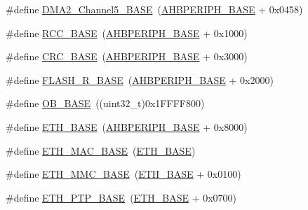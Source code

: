 \begin{DoxyCompactItemize}
\#define \mbox{\hyperlink{group___peripheral__memory__map_ga1eea983a5d68bf36f4d19fbb07955ca1}{D\+M\+A2\+\_\+\+Channel5\+\_\+\+B\+A\+SE}}~(\mbox{\hyperlink{group___peripheral__memory__map_ga92eb5d49730765d2abd0f5b09548f9f5}{A\+H\+B\+P\+E\+R\+I\+P\+H\+\_\+\+B\+A\+SE}} + 0x0458)
\item 
\#define \mbox{\hyperlink{group___peripheral__memory__map_ga0e681b03f364532055d88f63fec0d99d}{R\+C\+C\+\_\+\+B\+A\+SE}}~(\mbox{\hyperlink{group___peripheral__memory__map_ga92eb5d49730765d2abd0f5b09548f9f5}{A\+H\+B\+P\+E\+R\+I\+P\+H\+\_\+\+B\+A\+SE}} + 0x1000)
\item 
\#define \mbox{\hyperlink{group___peripheral__memory__map_ga656a447589e785594cbf2f45c835ad7e}{C\+R\+C\+\_\+\+B\+A\+SE}}~(\mbox{\hyperlink{group___peripheral__memory__map_ga92eb5d49730765d2abd0f5b09548f9f5}{A\+H\+B\+P\+E\+R\+I\+P\+H\+\_\+\+B\+A\+SE}} + 0x3000)
\item 
\#define \mbox{\hyperlink{group___peripheral__memory__map_ga8e21f4845015730c5731763169ec0e9b}{F\+L\+A\+S\+H\+\_\+\+R\+\_\+\+B\+A\+SE}}~(\mbox{\hyperlink{group___peripheral__memory__map_ga92eb5d49730765d2abd0f5b09548f9f5}{A\+H\+B\+P\+E\+R\+I\+P\+H\+\_\+\+B\+A\+SE}} + 0x2000)
\item 
\#define \mbox{\hyperlink{group___peripheral__memory__map_gab5b5fb155f9ee15dfb6d757da1adc926}{O\+B\+\_\+\+B\+A\+SE}}~((uint32\+\_\+t)0x1\+F\+F\+F\+F800)
\item 
\#define \mbox{\hyperlink{group___peripheral__memory__map_gad965a7b1106ece575ed3da10c45c65cc}{E\+T\+H\+\_\+\+B\+A\+SE}}~(\mbox{\hyperlink{group___peripheral__memory__map_ga92eb5d49730765d2abd0f5b09548f9f5}{A\+H\+B\+P\+E\+R\+I\+P\+H\+\_\+\+B\+A\+SE}} + 0x8000)
\item 
\#define \mbox{\hyperlink{group___peripheral__memory__map_ga3cf7005808feb61bff1fee01e50a711a}{E\+T\+H\+\_\+\+M\+A\+C\+\_\+\+B\+A\+SE}}~(\mbox{\hyperlink{group___peripheral__memory__map_gad965a7b1106ece575ed3da10c45c65cc}{E\+T\+H\+\_\+\+B\+A\+SE}})
\item 
\#define \mbox{\hyperlink{group___peripheral__memory__map_ga4946f2b3b03f7998343ac1778fbcf725}{E\+T\+H\+\_\+\+M\+M\+C\+\_\+\+B\+A\+SE}}~(\mbox{\hyperlink{group___peripheral__memory__map_gad965a7b1106ece575ed3da10c45c65cc}{E\+T\+H\+\_\+\+B\+A\+SE}} + 0x0100)
\item 
\#define \mbox{\hyperlink{group___peripheral__memory__map_gaa0f60b922aeb7275c785cbaa8f94ecf0}{E\+T\+H\+\_\+\+P\+T\+P\+\_\+\+B\+A\+SE}}~(\mbox{\hyperlink{group___peripheral__memory__map_gad965a7b1106ece575ed3da10c45c65cc}{E\+T\+H\+\_\+\+B\+A\+SE}} + 0x0700)

\end{DoxyCompactItemize}
